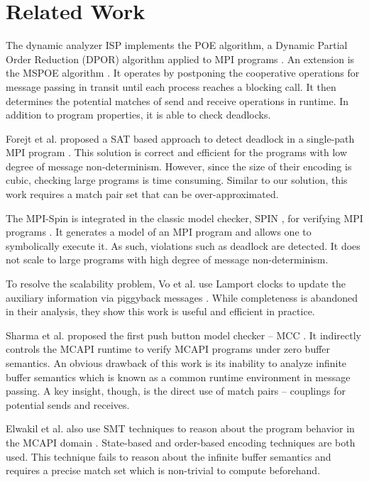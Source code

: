 \section{Related Work}
The dynamic analyzer ISP implements the POE algorithm, a Dynamic Partial Order Reduction (DPOR) algorithm \cite{DBLP:conf/popl/FlanaganG05} applied to MPI programs \cite{DBLP:conf/ppopp/VakkalankaSGK08}. An extension is the MSPOE algorithm \cite{DBLP:conf/sbmf/SharmaGB12}. It operates by postponing the cooperative operations for message passing in transit until each process reaches a blocking call. It then determines the potential matches of send and receive operations in runtime. In addition to program properties, it is able to check deadlocks.

Forejt et al. proposed a SAT based approach to detect deadlock in a single-path MPI program \cite{DBLP:conf/fm/ForejtKNS14}. This solution is correct and efficient for the programs with low degree of message non-determinism. However, since the size of their encoding is cubic, checking large programs is time consuming. Similar to our solution, this work requires a match pair set that can be over-approximated.

The MPI-Spin is integrated in the classic model checker, SPIN \cite{DBLP:journals/tse/Holzmann97}, for verifying MPI programs \cite{DBLP:conf/vmcai/Siegel07,DBLP:conf/pvm/Siegel07}. It generates a model of an MPI program and allows one to symbolically execute it. As such, violations such as deadlock are detected. It does not scale to large programs with high degree of message non-determinism.

To resolve the scalability problem, Vo et al. use Lamport clocks to update the auxiliary information via piggyback messages \cite{DBLP:conf/sc/VoAGSSB10,DBLP:conf/IEEEpact/VoGKSSB11}. While completeness is abandoned in their analysis, they show this work is useful and efficient in practice. 

Sharma et al. proposed the first push button model checker -- MCC \cite{DBLP:conf/fmcad/SharmaGMH09}. It indirectly controls the MCAPI runtime to verify MCAPI programs under zero buffer semantics. An obvious drawback of this work is its inability to analyze infinite buffer semantics which is known as a common runtime environment in message passing. A key insight, though, is the direct use of match pairs -- couplings for potential sends and receives.

Elwakil et al. also use SMT techniques to reason about the program behavior in the MCAPI domain \cite{DBLP:conf/issta/ElwakilY10,DBLP:conf/atva/ElwakilYW10}. State-based and order-based encoding techniques are both used. This technique fails to reason about the infinite buffer semantics and requires a precise match set which is non-trivial to compute beforehand.

